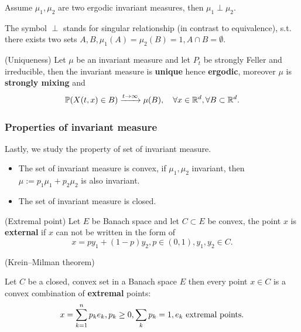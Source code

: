 \begin{lem}
Assume $\mu_1, \mu_2$ are two ergodic invariant measures, then $\mu_1 \perp \mu_2$. 
\end{lem}
The symbol $\perp$ stands for singular relationship (in contrast to equivalence), s.t. there exists two sets $A, B, \mu_1(A) = \mu_2(B) = 1, A\cap B = \emptyset$.

\begin{thm}{(Uniqueness)}\label{Thm: uniqueness}
Let $\mu$ be an invariant measure and let $P_t$ be strongly Feller and irreducible, then the invariant measure is \textbf{unique} hence \textbf{ergodic}, moreover $\mu$ is \textbf{strongly mixing} and
\begin{equation*}
    \mathbb{P}(X(t,x)\in B) \xrightarrow{t\to \infty} \mu(B),\quad \forall x\in\mathbb{R}^d, \forall B\subset \mathbb{R}^d.
\end{equation*}
\end{thm}

\subsubsection{Properties of invariant measure}
Lastly, we study the property of set of invariant measure. 
\begin{itemize}
    \item The set of invariant measure is convex, if $\mu_1, \mu_2$ invariant, then $\mu := p_1\mu_1 + p_2 \mu_2$ is also invariant.
    \item The set of invariant measure is closed.
\end{itemize}

\begin{thm}{(Extremal point)}
Let $E$ be Banach space and let $C \subset E$ be convex, the point $x$ is \textbf{external} if $x$ can not be written in the form of 
\begin{equation*}
    x = p y_1 +(1-p) y_2, p\in(0,1), y_1, y_2 \in C.
\end{equation*}
\end{thm}

\begin{thm}{(Krein–Milman theorem)}

Let $C$ be a closed, convex set in a Banach space $E$ then every point $x\in C$ is a convex combination of \textbf{extremal} points:
\begin{equation*}
    x = \sum\limits_{k=1}^n p_k e_k, p_k \geq 0, \sum_{k} p_k =1, e_k \text{ extremal points}.
\end{equation*}
\end{thm}

